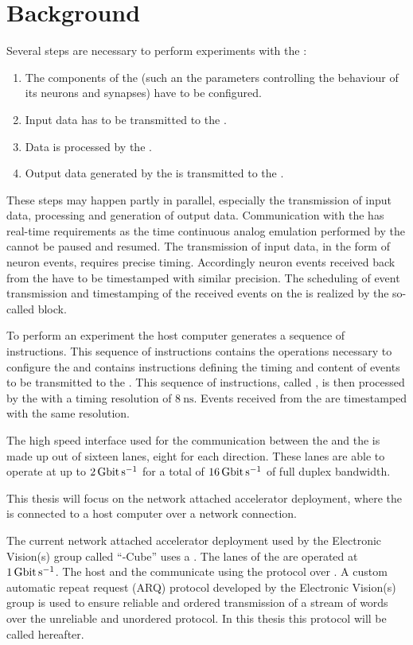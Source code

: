 \section{Background}
Several steps are necessary to perform experiments with the \HICANNX{}:
\begin{enumerate}
\item The components of the \ASIC{} (such an the parameters controlling the behaviour of its neurons and synapses) have to be configured.
\item Input data has to be transmitted to the \ASIC{}.
\item Data is processed by the \ASIC{}.
\item Output data generated by the \ASIC{} is transmitted to the \FPGA{}.
\end{enumerate}
These steps may happen partly in parallel, especially the transmission of input data, processing and generation of output data. Communication with the \ASIC{} has real-time requirements as the time continuous analog emulation performed by the \ASIC{} cannot be paused and resumed. The transmission of input data, in the form of neuron events, requires precise timing. Accordingly neuron events received back from the \ASIC{} have to be timestamped with similar precision.
The scheduling of event transmission and timestamping of the received events on the \FPGA{} is realized by the so-called \pbexec{} block.

To perform an experiment the host computer generates a sequence of instructions. This sequence of instructions contains the operations necessary to configure the \ASIC{} and contains instructions defining the timing and content of events to be transmitted to the \ASIC{}.
This sequence of instructions, called \PlaybackProgram{}, is then processed by the \pbexec{} with a timing resolution of $\SI{8}{\nano\second}$.
Events received from the \ASIC{} are timestamped with the same resolution.

The high speed interface used for the communication between the \ASIC{} and the \FPGA{} is made up out of sixteen \LVDS{} lanes, eight for each direction. These lanes are able to operate at up to $\SI{2}{\giga\bit\per\second}$ for a total of $\SI{16}{\giga\bit\per\second}$ of full duplex bandwidth.

This thesis will focus on the network attached accelerator deployment, where the \FPGA{} is connected to a host computer over a network connection.

The current network attached accelerator deployment used by the Electronic Vision(s) group called ``\BSSTwo{}-Cube''\autocite{ref:bss_cube} uses a \Xilinx{}  \FPGA{}. The \LVDS{} lanes of the \ASIC{} are operated at $\SI{1}{\giga\bit\per\second}$. The host and the \FPGA{} communicate using the \UDP{} protocol over \Gigabitethernet{}. A custom automatic repeat request (ARQ) protocol\autocite{ref:hostarq} developed by the Electronic Vision(s) group is used to ensure reliable and ordered transmission of a stream of \PhyWordSize{} words over the unreliable and unordered \UDP{} protocol. In this thesis this protocol will be called \HostARQ{} hereafter.

